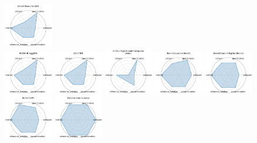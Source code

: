 \begin{figure}[ht!]
\includegraphics[width=0.1900\textwidth]{images/smart_pixels_for_lhc_radar.pdf}
\\[1ex]
\includegraphics[width=0.1900\textwidth]{images/hedm_braggnn_radar.pdf}
\includegraphics[width=0.1900\textwidth]{images/d-stem_radar.pdf}
\includegraphics[width=0.1900\textwidth]{images/in-situ_high-speed_computer_vision_radar.pdf}
\includegraphics[width=0.1900\textwidth]{images/benchcouncil_aibench_radar.pdf}
\includegraphics[width=0.1900\textwidth]{images/benchcouncil_bigdatabench_radar.pdf}
\\[1ex]
\includegraphics[width=0.1900\textwidth]{images/mlperf_hpc_radar.pdf}
\includegraphics[width=0.1900\textwidth]{images/mlcommons_science_radar.pdf}

\end{figure}
